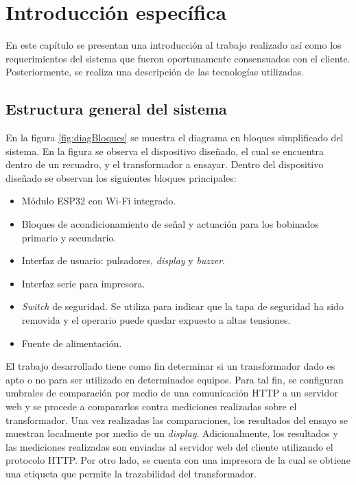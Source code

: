\chapter{Introducción específica} %
\label{Chapter2}

En este capítulo se presentan una introducción al trabajo realizado así como los requerimientos del sistema que fueron oportunamente consensuados con el cliente. Posteriormente, se realiza una descripción de las tecnologías utilizadas.

\section{Estructura general del sistema}

En la figura \ref{fig:diagBloques} se muestra el diagrama en bloques simplificado del sistema. En la figura se observa el dispositivo diseñado, el cual se encuentra dentro de un recuadro, y el transformador a ensayar. Dentro del dispositivo diseñado se observan los siguientes bloques principales:

\begin{itemize}
\item Módulo ESP32 con Wi-Fi integrado.
\item Bloques de acondicionamiento de señal y actuación para los bobinados primario y secundario.
\item Interfaz de usuario: pulsadores, \textit{display} y \textit{buzzer}.
\item Interfaz serie para impresora.
\item \textit{Switch} de seguridad. Se utiliza para indicar que la tapa de seguridad ha sido removida y el operario puede quedar expuesto a altas tensiones.
\item Fuente de alimentación.
\end{itemize}

El trabajo desarrollado tiene como fin determinar si un transformador dado es apto o no para ser utilizado en determinados equipos. Para tal fin, se configuran umbrales de comparación por medio de una comunicación HTTP a un servidor web y se procede a compararlos contra mediciones realizadas sobre el transformador. Una vez realizadas las comparaciones, los resultados del ensayo se muestran localmente por medio de un \textit{display}. Adicionalmente, los resultados y las mediciones realizadas son enviadas al servidor web del cliente utilizando el protocolo HTTP. Por otro lado, se cuenta con una impresora de la cual se obtiene una etiqueta que permite la trazabilidad del transformador.

